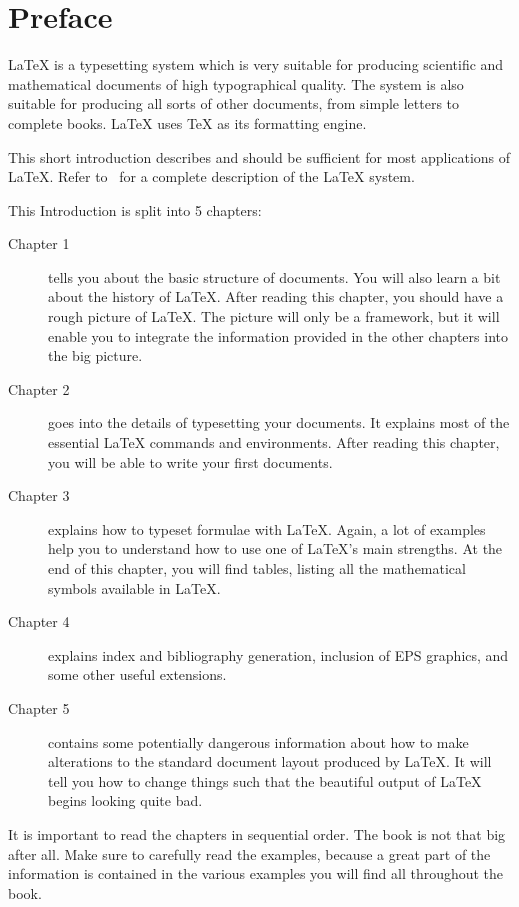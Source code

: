 \chapter{Preface}

\LaTeX{} \cite{manual} is a typesetting system which is very 
suitable for producing scientific and mathematical documents of high
typographical quality. The system is also suitable for producing all
sorts of other documents, from simple letters to complete books.
\LaTeX{} uses \TeX{} \cite{texbook} as its formatting engine.

This short introduction describes \LaTeXe{} and should be sufficient
for most applications of \LaTeX. Refer to~\cite{manual,companion} for
a complete description of the \LaTeX{} system.

\noindent This Introduction is split into 5 chapters:
\begin{description}
\item[Chapter 1] tells you about the basic structure of \LaTeXe{}
  documents. You will also learn a bit about the history of \LaTeX{}.
  After reading this chapter, you should have a rough picture of
  \LaTeX{}. The picture will only be a framework, but it will enable
  you to integrate the information provided in the other chapters into
  the big picture.
\item[Chapter 2] goes into the details of typesetting your
  documents. It explains most of the essential \LaTeX{} commands and
  environments. After reading this chapter, you will be able to write
  your first documents. 
\item[Chapter 3] explains how to typeset formulae with \LaTeX. Again, a
  lot of examples help you to understand how to use one of \LaTeX{}'s
  main strengths. At the end of this chapter, you will find tables, listing
  all the mathematical symbols available in \LaTeX{}.
\item[Chapter 4] explains index and  bibliography generation,
  inclusion of EPS graphics, and some other useful extensions.
\item[Chapter 5] contains some potentially dangerous information about
  how to make alterations to the
  standard document layout produced by \LaTeX{}. It will tell you how  to
  change things such that the beautiful output of \LaTeX{}
  begins looking quite bad.
\end{description}
\bigskip
It is important to read the chapters in sequential order. The book is
not that big after all. Make sure to carefully read the examples,
because a great part of the information is contained in the various
examples you will find all throughout the book.

